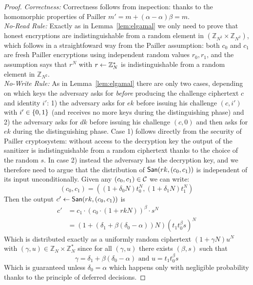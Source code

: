 \documentclass{llncs}
\begin{document}
\begin{proof} \emph{Correctness:} Correctness follows from inspection: thanks to the homomorphic properties of Pailler $m' = m + (\alpha-\alpha)\beta=m$. \\

\noindent \emph{No-Read Rule:} Exactly as in Lemma~\ref{lem:elgamal} we only need to prove that honest encryptions are indistinguishable from a random element in $(\mathbb{Z}_{N^2}\times\mathbb{Z}_{N^2})$, which follows in a straightfoward way from the Pailler assumption: both $c_0$ and $c_1$ are fresh Pailler encryptions using independent random values $r_0,r_1$, and the assumption says that $r^N$ with $r\leftarrow \mathbb{Z}^*_N$ is indistinguishable from a random element in $\mathbb{Z}_{N^2}$. \\

\noindent \emph{No-Write Rule:} As in Lemma~\ref{lem:elgamal} there are only two cases, depending on which keys the adversary asks for \emph{before} producing the challenge ciphertext $c$ and identity $i'$: 1) the adversary asks for $ek$ before issuing his challenge $(c,i')$ with $i'\in\{0,1\}$ (and receives no more keys during the distinguishing phase) and 2) the adversary asks for $dk$ before issuing his challenge $(c,0)$ and then asks for $ek$ during the distinguishing phase. Case 1) follows directly from the security of Pailler cryptosystem: without access to the decryption key the output of the sanitizer is indistinguishable from a random ciphertext thanks to the choice of the random $s$. In case 2) instead the adversary has the decryption key, and we therefore need to argue that the distribution of $\mathsf{San}(rk,(c_0,c_1))$ is independent of its input unconditionally. Given any $(c_0,c_1)\in  \mathcal{C}$ we can write:
$$
(c_0,c_1)=((1+\delta_0 N)t_0^N, (1+\delta_1 N)t_1^N)
$$
Then the output $c'\leftarrow \mathsf{San}(rk,(c_0,c_1))$ is
\begin{align*}
	c' &= c_1\cdot (c_0 \cdot (1+rkN) )^\beta \cdot s^N  \\
  	   &= (1+(\delta_1+\beta(\delta_0-\alpha)) N)(t_1t_0^\beta s)^N 
\end{align*}
Which is distributed exactly as a uniformly random ciphertext $(1+\gamma N)u^N$ with $(\gamma,u)\in  \mathbb{Z}_{N}\times\mathbb{Z}^*_{N}$ since for all $(\gamma,u)$ there exists $(\beta,s)$ such that 
$$
\gamma = \delta_1 + \beta (\delta_0-\alpha) \mbox{ and } u=t_1t_0^\beta s
$$
Which is guaranteed unless $\delta_0=\alpha$ which happens only with negligible probability thanks to the principle of deferred decisions.
\end{proof}
\end{document}
